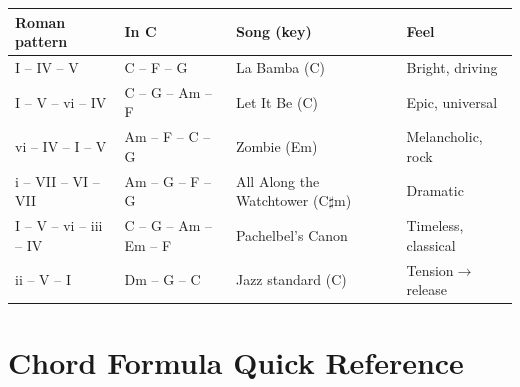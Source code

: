 \documentclass[a4paper,10pt]{article}
\begin{document}

\medskip
\begin{center}\small\setlength{\tabcolsep}{0.55em}
\renewcommand{\arraystretch}{1.3}
\begin{tabular}{llll}
\toprule
\textbf{Roman pattern} & \textbf{In C}
  & \textbf{Song (key)} & \textbf{Feel} \\
\midrule
I -- IV -- V
  & C -- F -- G        & La Bamba (C)                   & Bright, driving \\
I -- V -- vi -- IV
  & C -- G -- Am -- F  & Let It Be (C)                  & Epic, universal \\
vi -- IV -- I -- V
  & Am -- F -- C -- G  & Zombie (Em)                    & Melancholic, rock \\
i -- VII -- VI -- VII
  & Am -- G -- F -- G  & All Along the Watchtower (C$\sharp$m) & Dramatic \\
I -- V -- vi -- iii -- IV
  & C -- G -- Am -- Em -- F & Pachelbel's Canon          & Timeless, classical \\
ii -- V -- I
  & Dm -- G -- C       & Jazz standard (C)              & Tension$\to$release \\
\bottomrule
\end{tabular}
\end{center}

\section{Chord Formula Quick Reference}
\end{document}
